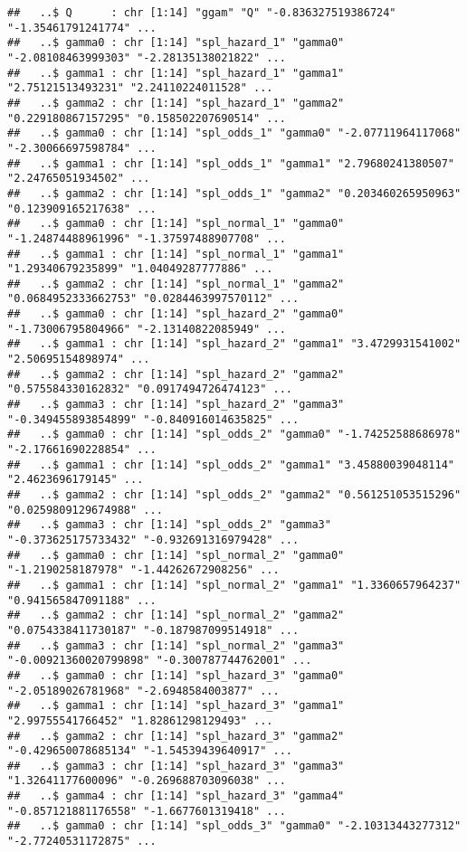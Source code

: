 \documentclass[
]{article}
\begin{document}
\begin{verbatim}
##   ..$ Q      : chr [1:14] "ggam" "Q" "-0.836327519386724" "-1.35461791241774" ...
##   ..$ gamma0 : chr [1:14] "spl_hazard_1" "gamma0" "-2.08108463999303" "-2.28135138021822" ...
##   ..$ gamma1 : chr [1:14] "spl_hazard_1" "gamma1" "2.75121513493231" "2.24110224011528" ...
##   ..$ gamma2 : chr [1:14] "spl_hazard_1" "gamma2" "0.229180867157295" "0.158502207690514" ...
##   ..$ gamma0 : chr [1:14] "spl_odds_1" "gamma0" "-2.07711964117068" "-2.30066697598784" ...
##   ..$ gamma1 : chr [1:14] "spl_odds_1" "gamma1" "2.79680241380507" "2.24765051934502" ...
##   ..$ gamma2 : chr [1:14] "spl_odds_1" "gamma2" "0.203460265950963" "0.123909165217638" ...
##   ..$ gamma0 : chr [1:14] "spl_normal_1" "gamma0" "-1.24874488961996" "-1.37597488907708" ...
##   ..$ gamma1 : chr [1:14] "spl_normal_1" "gamma1" "1.29340679235899" "1.04049287777886" ...
##   ..$ gamma2 : chr [1:14] "spl_normal_1" "gamma2" "0.0684952333662753" "0.0284463997570112" ...
##   ..$ gamma0 : chr [1:14] "spl_hazard_2" "gamma0" "-1.73006795804966" "-2.13140822085949" ...
##   ..$ gamma1 : chr [1:14] "spl_hazard_2" "gamma1" "3.4729931541002" "2.50695154898974" ...
##   ..$ gamma2 : chr [1:14] "spl_hazard_2" "gamma2" "0.575584330162832" "0.0917494726474123" ...
##   ..$ gamma3 : chr [1:14] "spl_hazard_2" "gamma3" "-0.349455893854899" "-0.840916014635825" ...
##   ..$ gamma0 : chr [1:14] "spl_odds_2" "gamma0" "-1.74252588686978" "-2.17661690228854" ...
##   ..$ gamma1 : chr [1:14] "spl_odds_2" "gamma1" "3.45880039048114" "2.4623696179145" ...
##   ..$ gamma2 : chr [1:14] "spl_odds_2" "gamma2" "0.561251053515296" "0.0259809129674988" ...
##   ..$ gamma3 : chr [1:14] "spl_odds_2" "gamma3" "-0.373625175733432" "-0.932691316979428" ...
##   ..$ gamma0 : chr [1:14] "spl_normal_2" "gamma0" "-1.2190258187978" "-1.44262672908256" ...
##   ..$ gamma1 : chr [1:14] "spl_normal_2" "gamma1" "1.3360657964237" "0.941565847091188" ...
##   ..$ gamma2 : chr [1:14] "spl_normal_2" "gamma2" "0.0754338411730187" "-0.187987099514918" ...
##   ..$ gamma3 : chr [1:14] "spl_normal_2" "gamma3" "-0.00921360020799898" "-0.300787744762001" ...
##   ..$ gamma0 : chr [1:14] "spl_hazard_3" "gamma0" "-2.05189026781968" "-2.6948584003877" ...
##   ..$ gamma1 : chr [1:14] "spl_hazard_3" "gamma1" "2.99755541766452" "1.82861298129493" ...
##   ..$ gamma2 : chr [1:14] "spl_hazard_3" "gamma2" "-0.429650078685134" "-1.54539439640917" ...
##   ..$ gamma3 : chr [1:14] "spl_hazard_3" "gamma3" "1.32641177600096" "-0.269688703096038" ...
##   ..$ gamma4 : chr [1:14] "spl_hazard_3" "gamma4" "-0.857121881176558" "-1.6677601319418" ...
##   ..$ gamma0 : chr [1:14] "spl_odds_3" "gamma0" "-2.10313443277312" "-2.77240531172875" ...

\end{verbatim}
\end{document}
